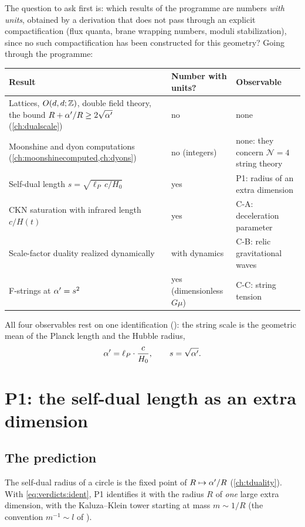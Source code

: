 The question to ask first is: which results of the programme are numbers \emph{with units},
obtained by a derivation that does not pass through an explicit compactification (flux quanta,
brane wrapping numbers, moduli stabilization), since no such compactification has been
constructed for this geometry? Going through the programme:
\begin{center}\small
\begin{tabular}{@{}p{}p{}>{\raggedright\arraybackslash}p{}@{}}
\toprule
Result & Number with units? & Observable \\
\midrule
Lattices, $O(d,d;\mathbb{Z})$, double field theory, the bound $R+\alpha'/R\ge2\sqrt{\alpha'}$ (\cref{ch:dualscale}) & no & none \\
Moonshine and dyon computations (\cref{ch:moonshinecomputed,ch:dyons}) & no (integers) & none: they concern $\mathcal N=4$ string theory \\
Self-dual length $s=\sqrt{\ell_P\,c/H_0}$ & yes & P1: radius of an extra dimension \\
CKN saturation with infrared length $c/H(t)$ & yes & C-A: deceleration parameter \\
Scale-factor duality realized dynamically & with dynamics & C-B: relic gravitational waves \\
F-strings at $\alpha'=s^2$ & yes (dimensionless $G\mu$) & C-C: string tension \\
\bottomrule
\end{tabular}
\end{center}
All four observables rest on one identification (\TC): the string scale is the geometric mean
of the Planck length and the Hubble radius,
\begin{equation}\label{eq:verdicts:ident}
 \alpha'=\ell_P\cdot\frac{c}{H_0},\qquad s=\sqrt{\alpha'}.
\end{equation}

\section{P1: the self-dual length as an extra dimension}\label{sec:verdicts:p1}

\subsection{The prediction}

The self-dual radius of a circle is the fixed point of $R\mapsto\alpha'/R$ (\cref{ch:tduality}). With
\eqref{eq:verdicts:ident}, P1 identifies it with the radius $R$ of \emph{one} large extra
dimension, with the Kaluza--Klein tower starting at mass $m\sim1/R$ (the convention
$m^{-1}\sim l$ of ).

